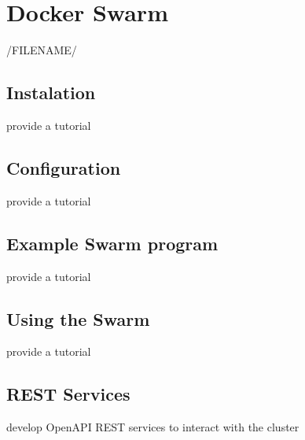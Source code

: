 \chapter{Docker Swarm}

/FILENAME/


\section{Instalation}

\begin{exercise}
provide a tutorial 
\end{exercise}

\section{Configuration}

\begin{exercise}
provide a tutorial 
\end{exercise}

\section{Example Swarm program}

\begin{exercise}
provide a tutorial 
\end{exercise}

\section{Using the Swarm}

\begin{exercise}
provide a tutorial 
\end{exercise}

\section{REST Services}

\begin{exercise}
develop OpenAPI REST services to interact with the cluster
\end{exercise}
